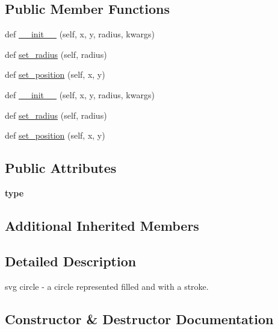 \subsection*{Public Member Functions}
\begin{DoxyCompactItemize}
\item 
def \hyperlink{classremi_1_1gui_1_1SvgCircle_a1048dd4ecd0ed38b92dc4b47867a5eb7}{\+\_\+\+\_\+init\+\_\+\+\_\+} (self, x, y, radius, kwargs)
\item 
def \hyperlink{classremi_1_1gui_1_1SvgCircle_aee5b9c0fcf53536a465caf949d1657e8}{set\+\_\+radius} (self, radius)
\item 
def \hyperlink{classremi_1_1gui_1_1SvgCircle_af133b230b01b0ae8fec9bd3243823240}{set\+\_\+position} (self, x, y)
\item 
def \hyperlink{classremi_1_1gui_1_1SvgCircle_a1048dd4ecd0ed38b92dc4b47867a5eb7}{\+\_\+\+\_\+init\+\_\+\+\_\+} (self, x, y, radius, kwargs)
\item 
def \hyperlink{classremi_1_1gui_1_1SvgCircle_aee5b9c0fcf53536a465caf949d1657e8}{set\+\_\+radius} (self, radius)
\item 
def \hyperlink{classremi_1_1gui_1_1SvgCircle_af133b230b01b0ae8fec9bd3243823240}{set\+\_\+position} (self, x, y)
\end{DoxyCompactItemize}
\subsection*{Public Attributes}
\begin{DoxyCompactItemize}
\item 
{\bfseries type}\hypertarget{classremi_1_1gui_1_1SvgCircle_ae2f9770d5dca0d3c62259beebd795e72}{}\label{classremi_1_1gui_1_1SvgCircle_ae2f9770d5dca0d3c62259beebd795e72}

\end{DoxyCompactItemize}
\subsection*{Additional Inherited Members}


\subsection{Detailed Description}
\begin{DoxyVerb}svg circle - a circle represented filled and with a stroke.\end{DoxyVerb}
 

\subsection{Constructor \& Destructor Documentation}

